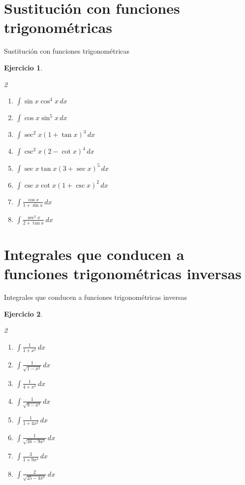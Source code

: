\documentclass[10pt,aspectratio=169]{beamer}
\newtheorem{Ejer}{Ejercicio}
\begin{document}
\section{Sustitución con funciones trigonométricas}
\begin{frame}{Sustitución con funciones trigonométricas}
\begin{Ejer}
\begin{multicols}{2}
\begin{enumerate}
\item $\displaystyle \int\sin x\cos^4x\,dx$
\item $\displaystyle \int\cos x\sin^5x\,dx$
\item $\displaystyle \int\sec^2x(1+\tan x)^3\,dx$
\item $\displaystyle \int\csc^2x(2-\cot x)^4\,dx$
\item $\displaystyle \int\sec x\tan x(3+\sec x)^5\,dx$
\item $\displaystyle \int\csc x\cot x(1+\csc x)^2\,dx$
\item $\displaystyle \int\frac{\cos x}{1+\sin x}\,dx$
\item $\displaystyle \int\frac{\sec^2x}{2+\tan x}\,dx$
\end{enumerate}
\end{multicols}
\end{Ejer}

\end{frame}

\section{Integrales que conducen a funciones trigonométricas inversas}
\begin{frame}{Integrales que conducen a funciones trigonométricas inversas}
\begin{Ejer}
\begin{multicols}{2}
\begin{enumerate}
\item $\displaystyle \int\frac{1}{1+x^2}\,dx$
\item $\displaystyle \int\frac{1}{\sqrt{1-x^2}}\,dx$
\item $\displaystyle \int\frac{1}{4+x^2}\,dx$
\item $\displaystyle \int\frac{1}{\sqrt{9-x^2}}\,dx$
\item $\displaystyle \int\frac{1}{1+4x^2}\,dx$
\item $\displaystyle \int\frac{1}{\sqrt{16-9x^2}}\,dx$
\item $\displaystyle \int\frac{3}{1+9x^2}\,dx$
\item $\displaystyle \int\frac{2}{\sqrt{25-4x^2}}\,dx$
\end{enumerate}
\end{multicols}
\end{Ejer}

\end{frame}
\end{document}

